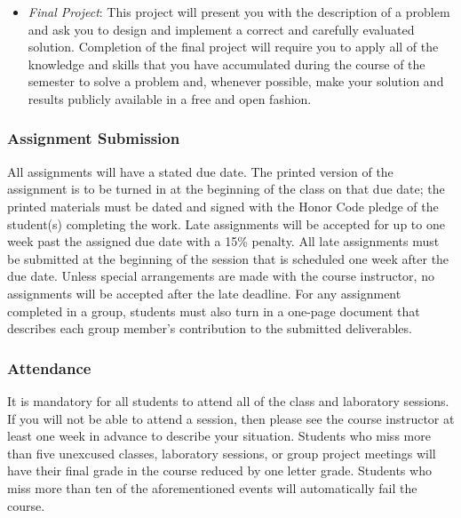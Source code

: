 \begin{itemize}
  \item {\em Final Project}: This project will present you with the description of a problem and ask you to design
    and implement a correct and carefully evaluated solution. Completion of the final project will require you to
    apply all of the knowledge and skills that you have accumulated during the course of the semester to solve a
    problem and, whenever possible, make your solution and results publicly available in a free and open fashion.

\end{itemize}

\subsubsection*{Assignment Submission}

All assignments will have a stated due date. The printed version of the assignment is to be turned in at the beginning
of the class on that due date; the printed materials must be dated and signed with the Honor Code pledge of the
student(s) completing the work.  Late assignments will be accepted for up to one week past the assigned due date with a
15\% penalty. All late assignments must be submitted at the beginning of the session that is scheduled one week after
the due date. Unless special arrangements are made with the course instructor, no assignments will be accepted after the
late deadline. For any assignment completed in a group, students must also turn in a one-page document that describes
each group member's contribution to the submitted deliverables.  

\subsubsection*{Attendance}

It is mandatory for all students to attend all of the class and laboratory sessions. If you will not be able to attend a
session, then please see the course instructor at least one week in advance to describe your situation.  Students who
miss more than five unexcused classes, laboratory sessions, or group project meetings will have their final grade in the
course reduced by one letter grade. Students who miss more than ten of the aforementioned events will automatically fail
the course.

% 
% 

